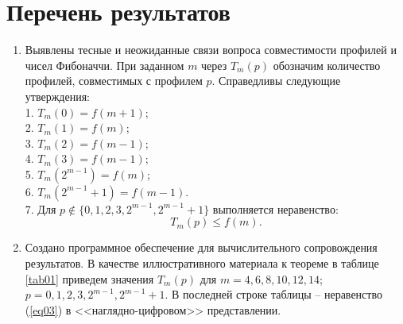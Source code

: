 \section{Перечень результатов}
\begin{enumerate}
	\item 
Выявлены тесные и неожиданные связи вопроса совместимости профилей и чисел Фибоначчи.
При заданном $m$ через $T_m(p)$   обозначим количество профилей, совместимых с профилем $p$.
Справедливы следующие утверждения:\\
1. $T_m(0)=f(m+1)$;\\
2. $T_m(1) = f(m)$;\\
3. $T_m(2)=f(m-1)$;\\
4. $T_m(3)=f(m-1)$;\\
5. $T_m(2^{m-1})=f(m)$;\\
6. $T_m(2^{m-1}+1)=f(m-1)$.\\
7. Для $p\notin \{0,1,2,3,2^{m-1}, 2^{m-1}+1\}$
выполняется неравенство: 
\begin {equation} \label {eq03}
T_m(p) \le f(m).
\end{equation}
\item
Создано программное обеспечение для вычислительного сопровождения результатов.
В качестве иллюстративного материала к теореме в таблице \ref{tab01} приведем значения $T_m(p)$ для $m=4,6,8,10,12,14$; $p=0, 1, 2, 3, 2^{m-1}, 2^{m-1}+1$. В последней строке таблицы  -- неравенство (\ref{eq03}) в <<наглядно-цифровом>> представлении.


\end{enumerate}
